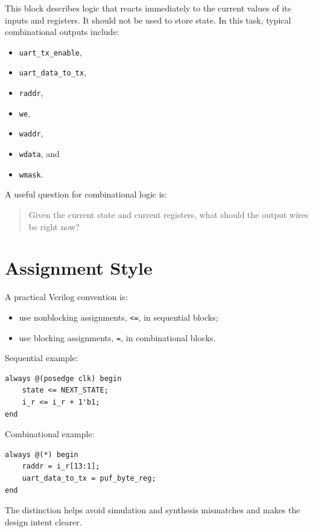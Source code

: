 \documentclass[11pt,a4paper]{article}
\begin{document}
This block describes logic that reacts immediately to the current values of its inputs and registers. It should not be used to store state. In this task, typical combinational outputs include:

\begin{itemize}
  \item \texttt{uart\_tx\_enable},
  \item \texttt{uart\_data\_to\_tx},
  \item \texttt{raddr},
  \item \texttt{we},
  \item \texttt{waddr},
  \item \texttt{wdata}, and
  \item \texttt{wmask}.
\end{itemize}

A useful question for combinational logic is:

\begin{quote}
Given the current state and current registers, what should the output wires be right now?
\end{quote}

\section{Assignment Style}

A practical Verilog convention is:

\begin{itemize}
  \item use nonblocking assignments, \texttt{<=}, in sequential blocks;
  \item use blocking assignments, \texttt{=}, in combinational blocks.
\end{itemize}

Sequential example:

\begin{lstlisting}
always @(posedge clk) begin
    state <= NEXT_STATE;
    i_r <= i_r + 1'b1;
end
\end{lstlisting}

Combinational example:

\begin{lstlisting}
always @(*) begin
    raddr = i_r[13:1];
    uart_data_to_tx = puf_byte_reg;
end
\end{lstlisting}

The distinction helps avoid simulation and synthesis mismatches and makes the design intent clearer.
\end{document}
